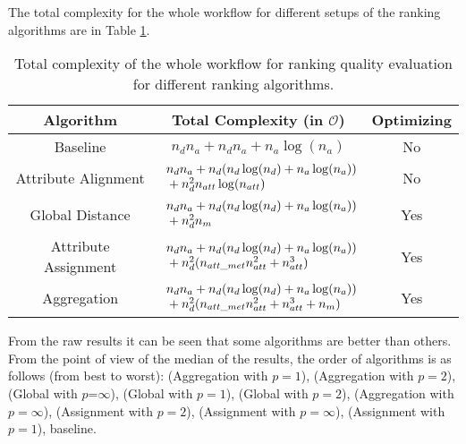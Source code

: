 \documentclass{article}
\begin{document}
\begin{refsegment}
The total complexity for the whole workflow for different setups of the ranking algorithms are in Table \ref{table:totalComplexities}.

\begin{table} 
	\caption{Total complexity of the whole workflow for ranking quality evaluation for different ranking algorithms.}
	\label{table:totalComplexities}
	\centering 
	\renewcommand{\arraystretch}{1.3}
	\begin{tabular}{|c| c| c|}
		\hline %
		Algorithm & Total Complexity (in $\mathcal{O}$) & Optimizing \\
		\hline 
		Baseline & $n_dn_a + n_dn_a + n_a\log(n_a)$ & No\\ 
		\hline 
		Attribute Alignment& $\begin{array} {r@{}l@{}} & {} n_dn_a + n_d(n_d\log(n_d)+n_a\log(n_a)) \\ & {} + n_d^2n_{att}\log(n_{att}) \end{array}$ & No\\    \hline 
		Global Distance& $\begin{array} {r@{}l@{}} & {} n_dn_a + n_d(n_d\log(n_d)+n_a\log(n_a)) \\ & {} + n_d^2n_m \end{array}$ & Yes\\    \hline 
		Attribute Assignment& $\begin{array} {r@{}l@{}} & {} n_dn_a + n_d(n_d\log(n_d)+n_a\log(n_a)) \\ & {} + n_d^2(n_{att\_met}n_{att}^2+n_{att}^3) \end{array}$ & Yes\\    \hline 
		Aggregation& $\begin{array} {r@{}l@{}} & {} n_dn_a + n_d(n_d\log(n_d)+n_a\log(n_a)) \\ & {} +  n_d^2(n_{att\_met}n_{att}^2+n_{att}^3+n_m) \end{array}$ & Yes\\    \hline 
	\end{tabular}
\end{table}

From the raw results it can be seen that some algorithms are better than others. From the point of view of the median of the results, the order of algorithms is as follows (from best to worst): (Aggregation with $p=1$), (Aggregation with $p=2$), (Global with $p$=$\infty$), (Global with $p=1$), (Global with $p=2$), (Aggregation with $p=\infty$), (Assignment with $p=2$), (Assignment with $p=\infty$), (Assignment with $p=1$), baseline.


\end{refsegment}
\end{document}
